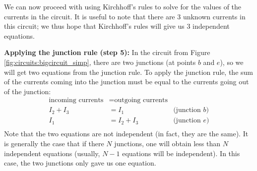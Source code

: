 We can now proceed with using Kirchhoff's rules to solve for the values of the currents in the circuit. It is useful to note that there are 3 unknown currents in this circuit; we thus hope that Kirchhoff's rules will give us 3 independent equations.

\textbf{Applying the junction rule (step 5): }In the circuit from Figure \ref{fig:circuits:bigcircuit_simp}, there are two junctions (at points $b$ and $e$), so we will get two equations from the junction rule. To apply the junction rule, the sum of the currents coming into the junction must be equal to the currents going out of the junction:
\begin{align*}
\text{incoming currents}&=\text{outgoing currents}&\\
I_2+I_3 &= I_1 \quad &\text{(junction $b$)}\\
I_1 &= I_2+I_3 \quad &\text{(junction $e$)}\\
\end{align*}
Note that the two equations are not independent (in fact, they are the same). It is generally the case that if there $N$ junctions, one will obtain less than $N$ independent equations (usually, $N-1$ equations will be independent). In this case, the two junctions only gave us one equation. 


